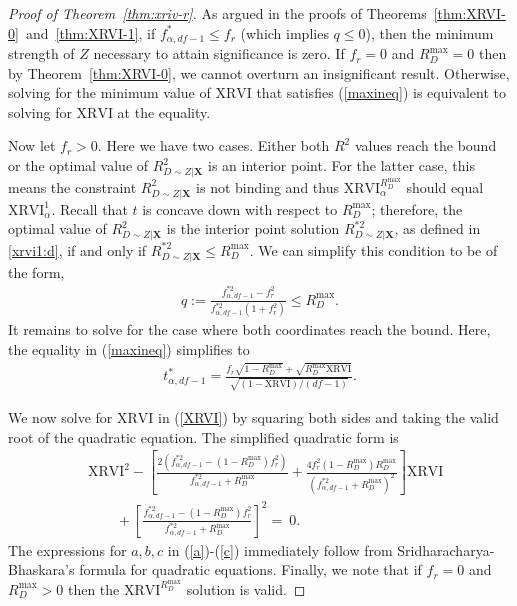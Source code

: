 \documentclass[10pt,a4paper]{amsart}
\newcommand{\Rdmax}{R^{\max }_{D}}
\newcommand{\Rdstar}{R^{* 2}_{D\sim Z | \mathbf{X}}}
\newcommand{\Rd}{R^2_{D\sim Z | \mathbf{X}}}
\newcommand{\XRVI}{\text{XRVI}}
\newcommand{\df}{df}
\newcommand{\fstarsq}{f^{* 2}_{\alpha, \df-1}}
\newcommand{\fstar}{f^*_{\alpha, \df-1}}
\newcommand{\tstar}{t^*_{\alpha, \df-1}}
\begin{document}
\begin{proof}[Proof of Theorem~\ref{thm:xriv-r}]
As argued in the proofs of Theorems~\ref{thm:XRVI-0}~and~\ref{thm:XRVI-1}, if $\fstar \leq f_{r} $ (which implies $q\leq 0$), then the minimum strength of $Z$  necessary to attain significance is zero.  If $f_r = 0$ and $\Rdmax = 0$ then by Theorem~\ref{thm:XRVI-0}, we cannot overturn an insignificant result. Otherwise, solving for the minimum value of $\XRVI$ that satisfies (\ref{maxineq}) is equivalent to solving for $\XRVI$ at the equality. 

Now let $f_r>0$. Here we have two cases. Either both $R^2$ values reach the bound or the optimal value of $\Rd$ is an interior point. For the latter case, this means the constraint $\Rd$ is not binding and thus $\XRVI^{\Rdmax}_{\alpha}$ should equal  $\XRVI^{1}_{\alpha}$. Recall that $t$ is concave down with respect to $\Rdmax$; therefore, the optimal value of $\Rd$ is the interior point solution $\Rdstar$, as defined in \eqref{xrvi1:d}, if and only if $\Rdstar \leq \Rdmax$. We can simplify this condition to be of the form,
%
\begin{align*}
     q:=\frac{\fstarsq - f_r^2}{\fstarsq (1+ f_r^2)} \leq \Rdmax.
\end{align*}
It remains to solve for the case where both coordinates reach the bound. Here, the equality in (\ref{maxineq}) simplifies to
    \begin{align}
        {\textstyle \tstar = \frac{f_{r} \sqrt{1-\Rdmax} + \sqrt{\Rdmax\XRVI}}{\sqrt{(1-\XRVI)/(\df-1)}}.} \label{XRVI}
    \end{align}
    
We now solve for $\XRVI$ in (\ref{XRVI}) by squaring both sides and taking the valid root of the quadratic equation. The simplified quadratic form is
\begin{align}
        &{\scriptstyle \XRVI^2 - \left[ \frac{2(\fstarsq - (1-\Rdmax)f_r^2)}{\fstarsq + \Rdmax} + \frac{4f_r^2(1-\Rdmax)\Rdmax}{(\fstarsq + \Rdmax)^2} \right]\XRVI} \nonumber \\
        &{\scriptstyle \quad \quad + \left[\frac{\fstarsq - (1-\Rdmax)f_r^2}{\fstarsq + \Rdmax}\right]^2 = ~0. }
\end{align}
The expressions for $a,b,c$ in (\ref{a})-(\ref{c}) immediately follow from Sridharacharya-Bhaskara's formula for quadratic equations.  Finally, we note that if $f_r=0$ and $\Rdmax > 0$ then the $\XRVI^{\Rdmax}$ solution is valid. 
\end{proof}
\end{document}
